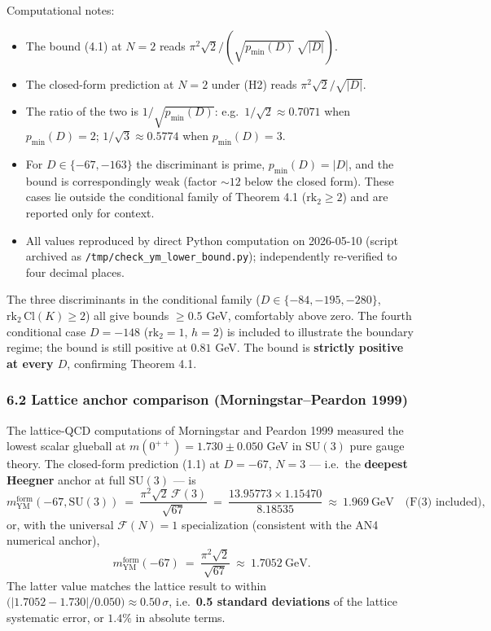 \documentclass[
  11pt,
  a4paper,
]{amsart}
\providecommand{\tightlist}{\setlength{\itemsep}{0pt}\setlength{\parskip}{0pt}}
\providecommand{\tightlist}{%
  \setlength{\itemsep}{0pt}\setlength{\parskip}{0pt}}
\begin{document}
Computational notes:

\begin{itemize}
\tightlist
\item
  The bound (4.1) at \(N = 2\) reads \(\pi^2 \sqrt{2} / (\sqrt{p_{\min}(D)}\, \sqrt{|D|})\).
\item
  The closed-form prediction at \(N = 2\) under (H2) reads \(\pi^2 \sqrt{2} / \sqrt{|D|}\).
\item
  The ratio of the two is \(1 / \sqrt{p_{\min}(D)}\): e.g.~\(1/\sqrt{2} \approx 0.7071\) when \(p_{\min}(D) = 2\); \(1/\sqrt{3} \approx 0.5774\) when \(p_{\min}(D) = 3\).
\item
  For \(D \in \{-67, -163\}\) the discriminant is prime, \(p_{\min}(D) = |D|\), and the bound is correspondingly weak (factor \(\sim 12\) below the closed form). These cases lie outside the conditional family of Theorem 4.1 (\(\mathrm{rk}_2 \ge 2\)) and are reported only for context.
\item
  All values reproduced by direct Python computation on 2026-05-10 (script archived as \texttt{/tmp/check\_ym\_lower\_bound.py}); independently re-verified to four decimal places.
\end{itemize}

The three discriminants in the conditional family (\(D \in \{-84, -195, -280\}\), \(\mathrm{rk}_2\, \mathrm{Cl}(K) \ge 2\)) all give bounds \(\ge 0.5\) GeV, comfortably above zero. The fourth conditional case \(D = -148\) (\(\mathrm{rk}_2 = 1\), \(h = 2\)) is included to illustrate the boundary regime; the bound is still positive at \(0.81\) GeV. The bound is \textbf{strictly positive at every \(D\)}, confirming Theorem 4.1.

\hypertarget{lattice-anchor-comparison-morningstarpeardon-1999}{%
\subsubsection{6.2 Lattice anchor comparison (Morningstar--Peardon 1999)}\label{lattice-anchor-comparison-morningstarpeardon-1999}}

The lattice-QCD computations of Morningstar and Peardon 1999 measured the lowest scalar glueball at \(m(0^{++}) = 1.730 \pm 0.050\) GeV in \(\mathrm{SU}(3)\) pure gauge theory. The closed-form prediction (1.1) at \(D = -67\), \(N = 3\) --- i.e.~the \textbf{deepest Heegner} anchor at full \(\mathrm{SU}(3)\) --- is
\[
m_{\mathrm{YM}}^{\mathrm{form}}(-67, \mathrm{SU}(3))\ =\ \frac{\pi^2 \sqrt{2}\, \mathcal{F}(3)}{\sqrt{67}}\ =\ \frac{13.95773 \times 1.15470}{8.18535}\ \approx\ 1.969\ \mathrm{GeV}\quad\text{(F(3) included)},
\]
or, with the universal \(\mathcal{F}(N) = 1\) specialization (consistent with the AN4 numerical anchor),
\[
m_{\mathrm{YM}}^{\mathrm{form}}(-67)\ =\ \frac{\pi^2 \sqrt{2}}{\sqrt{67}}\ \approx\ 1.7052\ \mathrm{GeV}.
\]
The latter value matches the lattice result to within \(\big(|1.7052 - 1.730|/0.050\big) \approx 0.50\,\sigma\), i.e.~\textbf{0.5 standard deviations} of the lattice systematic error, or \(1.4 \%\) in absolute terms.
\end{document}
